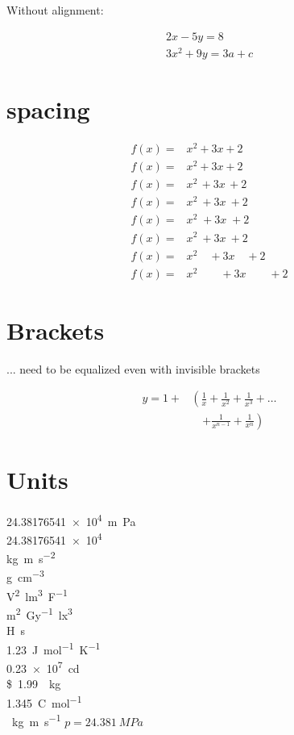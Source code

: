 Without alignment:

\begin{gather} 
2x - 5y =  8 \\ 
3x^2 + 9y =  3a + c
\end{gather}

\section{spacing}
\begin{align*}
f(x) =& x^2\! +3x\! +2 \\
f(x) =& x^2+3x+2 \\
f(x) =& x^2\, +3x\, +2 \\
f(x) =& x^2\: +3x\: +2 \\
f(x) =& x^2\; +3x\; +2 \\
f(x) =& x^2\ +3x\ +2 \\
f(x) =& x^2\quad +3x\quad +2 \\
f(x) =& x^2\qquad +3x\qquad +2
\end{align*}

\section{Brackets}

... need to be equalized even with invisible brackets

\begin{align}
y  = 1 + & \left(  \frac{1}{x} + \frac{1}{x^2} + \frac{1}{x^3} + \ldots \right. \\
& \quad \left. + \frac{1}{x^{n-1}} + \frac{1}{x^n} \right)	
\end{align}

\section{Units}
\SI{24,38176541e4}{m.Pa} \\
\num{24,38176541e4} \\
\si{\kilo\gram\metre\per\square\second} \\
\si{\gram\per\cubic\centi\metre}        \\
\si{\square\volt\cubic\lumen\per\farad} \\
\si{\metre\squared\per\gray\cubic\lux}  \\
\si{\henry\second} \\
\SI[mode=text]{1.23}{J.mol^{-1}.K^{-1}}          \\
\SI{.23e7}{\candela}                              \\
\SI[per-mode=symbol]{1.99}[\$]{\per\kilogram}    \\
\SI[per-mode=fraction]{1,345}{\coulomb\per\mole} \\
\si[unit-color=blue]{\kilogram\metre\per\second}
$p=\SI{24,381}{MPa}$

